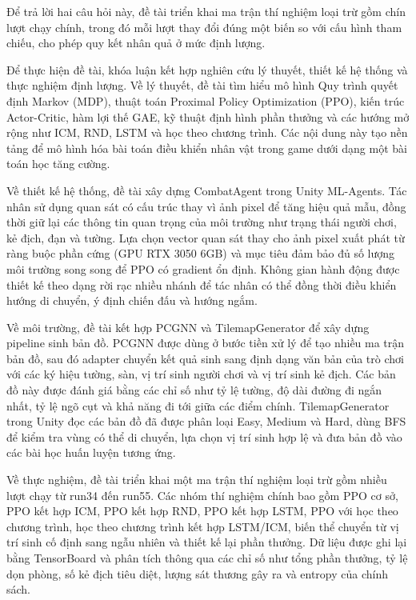 Để trả lời hai câu hỏi này, đề tài triển khai ma trận thí nghiệm loại trừ gồm chín lượt chạy chính, trong đó mỗi lượt thay đổi đúng một biến so với cấu hình tham chiếu, cho phép quy kết nhân quả ở mức định lượng.

\vspace{0.5cm}


Để thực hiện đề tài, khóa luận kết hợp nghiên cứu lý thuyết, thiết kế hệ thống và thực nghiệm định lượng. Về lý thuyết, đề tài tìm hiểu mô hình Quy trình quyết định Markov (MDP), thuật toán Proximal Policy Optimization (PPO), kiến trúc Actor-Critic, hàm lợi thế GAE, kỹ thuật định hình phần thưởng và các hướng mở rộng như ICM, RND, LSTM và học theo chương trình. Các nội dung này tạo nền tảng để mô hình hóa bài toán điều khiển nhân vật trong game dưới dạng một bài toán học tăng cường.

Về thiết kế hệ thống, đề tài xây dựng CombatAgent trong Unity ML-Agents. Tác nhân sử dụng quan sát có cấu trúc thay vì ảnh pixel để tăng hiệu quả mẫu, đồng thời giữ lại các thông tin quan trọng của môi trường như trạng thái người chơi, kẻ địch, đạn và tường. Lựa chọn vector quan sát thay cho ảnh pixel xuất phát từ ràng buộc phần cứng (GPU RTX 3050 6GB) và mục tiêu đảm bảo đủ số lượng môi trường song song để PPO có gradient ổn định. Không gian hành động được thiết kế theo dạng rời rạc nhiều nhánh để tác nhân có thể đồng thời điều khiển hướng di chuyển, ý định chiến đấu và hướng ngắm.

Về môi trường, đề tài kết hợp PCGNN và TilemapGenerator để xây dựng pipeline sinh bản đồ. PCGNN được dùng ở bước tiền xử lý để tạo nhiều ma trận bản đồ, sau đó adapter chuyển kết quả sinh sang định dạng văn bản của trò chơi với các ký hiệu tường, sàn, vị trí sinh người chơi và vị trí sinh kẻ địch. Các bản đồ này được đánh giá bằng các chỉ số như tỷ lệ tường, độ dài đường đi ngắn nhất, tỷ lệ ngõ cụt và khả năng đi tới giữa các điểm chính. TilemapGenerator trong Unity đọc các bản đồ đã được phân loại Easy, Medium và Hard, dùng BFS để kiểm tra vùng có thể di chuyển, lựa chọn vị trí sinh hợp lệ và đưa bản đồ vào các bài học huấn luyện tương ứng.

Về thực nghiệm, đề tài triển khai một ma trận thí nghiệm loại trừ gồm nhiều lượt chạy từ run34 đến run55. Các nhóm thí nghiệm chính bao gồm PPO cơ sở, PPO kết hợp ICM, PPO kết hợp RND, PPO kết hợp LSTM, PPO với học theo chương trình, học theo chương trình kết hợp LSTM/ICM, biến thể chuyển từ vị trí sinh cố định sang ngẫu nhiên và thiết kế lại phần thưởng. Dữ liệu được ghi lại bằng TensorBoard và phân tích thông qua các chỉ số như tổng phần thưởng, tỷ lệ dọn phòng, số kẻ địch tiêu diệt, lượng sát thương gây ra và entropy của chính sách.

